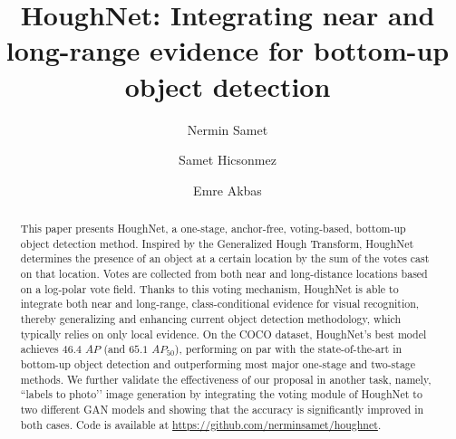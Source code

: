 \documentclass[runningheads]{llncs}
\begin{document}
\pagestyle{headings}
\mainmatter
\def\ECCVSubNumber{5063}  





\title{HoughNet: Integrating near and long-range evidence for bottom-up object detection} 


\begin{comment}
\titlerunning{ECCV-20 submission ID \ECCVSubNumber}
\authorrunning{ECCV-20 submission ID \ECCVSubNumber}
\author{Anonymous ECCV submission}
\institute{Paper ID \ECCVSubNumber}
\end{comment}



\author{Nermin Samet \and
Samet Hicsonmez \and
Emre Akbas}


\maketitle

\begin{abstract}


This paper presents HoughNet, a one-stage, anchor-free, voting-based, bottom-up object detection method. Inspired by the Generalized Hough Transform, HoughNet determines the presence of an object at a certain location by the sum of the votes cast on that location. Votes are collected from both near and long-distance locations based on a log-polar vote field. Thanks to this voting mechanism, HoughNet is able to integrate both near and long-range, class-conditional evidence for visual recognition, thereby generalizing and enhancing current object detection methodology, which typically relies on only local evidence.  On the COCO dataset, HoughNet’s best model achieves $46.4$ $AP$ (and $65.1$ $AP_{50}$), performing on par with the state-of-the-art in bottom-up object detection and outperforming most  major one-stage and two-stage methods. We further validate the effectiveness of our proposal in another task, namely, ``labels to photo’’ image generation by integrating the voting module of HoughNet to two different GAN models and showing that the accuracy is significantly improved in both cases. Code is available at \url{https://github.com/nerminsamet/houghnet}. 
\end{abstract}
\end{document}
